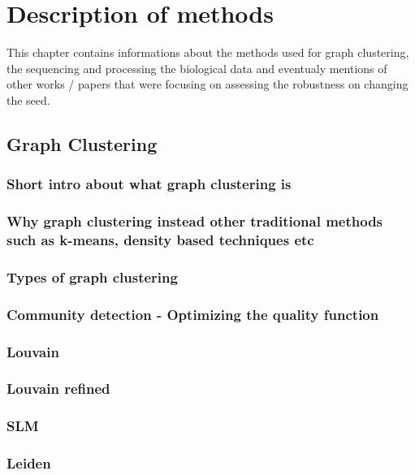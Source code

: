\chapter{Description of methods}

This chapter contains informations about the methods used for graph clustering, the sequencing and processing the biological data and eventualy mentions of other works / papers that were focusing on assessing the robustness on changing the seed.

\section{Graph Clustering}

\subsection{Short intro about what graph clustering is}

\subsection{Why graph clustering instead other traditional methods such as k-means, density based techniques etc}

\subsection{Types of graph clustering}

\subsection{Community detection - Optimizing the quality function}

\subsection{Louvain}

\subsection{Louvain refined}
\subsection{SLM}
\subsection{Leiden}
\subsection{}


